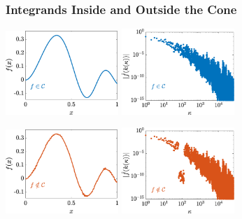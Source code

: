\documentclass[10pt,compress,xcolor={usenames,dvipsnames},aspectratio=169]{beamer} %
\begin{document}
\begin{frame}
\frametitle{Integrands Inside and Outside the Cone}

\centerline{
\includegraphics[width = 0.32\textwidth] 
{Programs/FunctionWalshFourierCoeffDecay.eps} \qquad 
\includegraphics[width = 0.32\textwidth] 
{Programs/WalshFourierCoeffDecay128.eps}}

\centerline{
\includegraphics[width = 0.32\textwidth] 
{Programs/FilteredFunctionWalshFourierCoeffDecay.eps} \qquad
\includegraphics[width = 0.32\textwidth] 
{Programs/WalshFourierCoeffDecayFilter.eps}}
{\tiny }
\end{frame}
\end{document}
